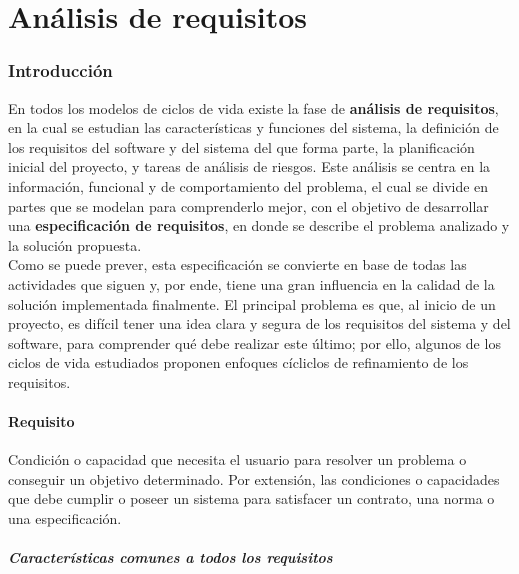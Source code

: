\part{Análisis de requisitos}

\section{Introducción}

En todos los modelos de ciclos de vida existe la fase de \textbf{análisis de requisitos}, en la cual se estudian las características y funciones del sistema, la definición de los requisitos del software y del sistema del que forma parte, la planificación inicial del proyecto, y tareas de análisis de riesgos. Este análisis se centra en la información, funcional y de comportamiento del problema, el cual se divide en partes que se modelan para comprenderlo mejor, con el objetivo de desarrollar una \textbf{especificación de requisitos}, en donde se describe el problema analizado y la solución propuesta.\\

Como se puede prever, esta especificación se convierte en base de todas las actividades que siguen y, por ende, tiene una gran influencia en la calidad de la solución implementada finalmente. El principal problema es que, al inicio de un proyecto, es difícil tener una idea clara y segura de los requisitos del sistema y del software, para comprender qué debe realizar este último; por ello, algunos de los ciclos de vida estudiados proponen enfoques cícliclos de refinamiento de los requisitos.

\subsection{Requisito}

Condición o capacidad que necesita el usuario para resolver un problema o conseguir un objetivo determinado. Por extensión, las condiciones o capacidades que debe cumplir o poseer un sistema para satisfacer un contrato, una norma o una especificación.

\subsubsection{Características comunes a todos los requisitos}

